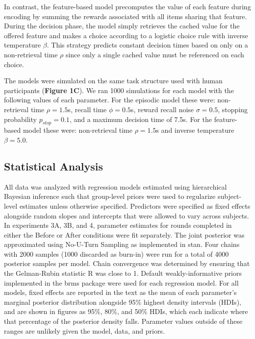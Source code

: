 \documentclass[10pt,letterpaper]{article}
\begin{document}
In contrast, the feature-based model precomputes the value of each feature during encoding by summing the rewards associated with all items sharing that feature. During the decision phase, the model simply retrieves the cached value for the offered feature and makes a choice according to a logistic choice rule with inverse temperature $\beta$. This strategy predicts constant decision times based on only on a non-retrieval time $\rho$ since only a single cached value must be referenced on each choice.

The models were simulated on the same task structure used with human participants (\textbf{Figure 1C}). We ran 1000 simulations for each model with the following values of each parameter. For the episodic model these were: non-retrieval time $\rho = 1.5$s, recall time $\phi = 0.5$s, reward recall noise $\sigma = 0.5$, stopping probability $p_{stop} = 0.1$, and a maximum decision time of 7.5s. For the feature-based model these were: non-retrieval time $\rho = 1.5$s and inverse temperature $\beta = 5.0$.

\subsection{Statistical Analysis}

All data was analyzed with regression models estimated using hierarchical Bayesian inference such that group-level priors were used to regularize subject-level estimates unless otherwise specified. Predictors were specified as fixed effects alongside random slopes and intercepts that were allowed to vary across subjects. In experiments 3A, 3B, and 4, parameter estimates for rounds completed in either the Before or After conditions were fit separately. The joint posterior was approximated using No-U-Turn Sampling as implemented in stan\cite{hoffmanNoUTurnSamplerAdaptively2014}. Four chains with 2000 samples (1000 discarded as burn-in) were run for a total of 4000 posterior samples per model. Chain convergence was determined by ensuring that the Gelman-Rubin statistic R was close to 1. Default weakly-informative priors implemented in the brms package were used for each regression model\cite{burknerBrmsPackageBayesian2017}. For all models, fixed effects are reported in the text as the mean of each parameter’s marginal posterior distribution alongside 95\% highest density intervals (HDIs), and are shown in figures as 95\%, 80\%, and 50\% HDIs, which each indicate where that percentage of the posterior density falls. Parameter values outside of these ranges are unlikely given the model, data, and priors.
\end{document}
